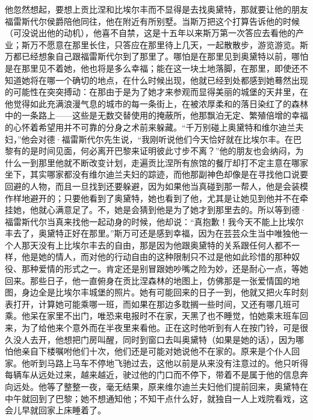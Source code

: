 \par 他忽然想起，要想上贡比涅和比埃尔丰而不显得是去找奥黛特，那就要让他的朋友福雷斯代尔侯爵陪他同往，他在附近有所别墅。当斯万把这个打算告诉他的时候（可没说出他的动机），他喜不自禁，这是十五年以来斯万第一次答应去看他的产业；斯万不愿意在那里长住，只答应在那里待上几天，一起散散步，游览游览。斯万都已经想象自己跟福雷斯代尔到了那里了。哪怕是在那里见到奥黛特以前，哪怕是在那里见不着她，他也将是多么幸福；能在这一块土地落脚，在那里，即使还不知道她将在哪一个确切的地点，在什么时候出现，他就已经到处都感到她蓦然出现的可能性在突突搏动：在那由于是为了她才来参观而显得美丽的城堡的天井里，在他觉得如此充满浪漫气息的城市的每一条街上，在被浓厚柔和的落日染红了的森林中的一条路上——这些是无数交替使用的掩蔽所，他那飘泊无定、繁殖倍增的幸福的心怀着希望用并不可靠的分身之术前来躲藏。“千万别碰上奥黛特和维尔迪兰夫妇，”他会对德·福雷斯代尔先生说，“我刚听说他们今天恰好就在比埃尔丰。在巴黎有的是时间见面，何必离开巴黎来证明彼此寸步不离？”他的朋友也会纳闷，为什么一到那里他就不断改变计划，走遍贡比涅所有旅馆的餐厅却打不定主意在哪家坐下，其实哪家都没有维尔迪兰夫妇的踪迹，而他那副神色却像是在寻找他口说要回避的人物，而且一旦找到还要躲避，因为如果他当真碰到那一帮人，他是会装模作样地避开的；只要他看到了奥黛特，她也看到了他，尤其是让她见到他并不在牵挂她，他就心满意足了。不，她是会猜到他是为了她才到那里去的。所以等到德·福雷斯代尔当真来找他一起动身的时候，他却说：“真抱歉！我今天不能上比埃尔丰去了，奥黛特正好在那里。”斯万可还是感到幸福，因为在芸芸众生当中唯独他一个人那天没有上比埃尔丰去的自由，那是因为他跟奥黛特的关系跟任何人都不一样，他是她的情人，而对他的行动自由的这种限制只不过是他如此珍惜的那种奴役、那种爱情的形式之一。肯定还是别冒跟她吵嘴之险为妙，还是耐心一点，等她回来。那些日子，他一直俯身在贡比涅森林的地图上，仿佛那是一张爱情国的地图，身边全是比埃尔丰城堡的照片。她有可能回来的日子一到，他就又把火车时刻表打开，计算她可能乘哪一班，而如果在那边多耽搁一些时间，又还有哪几班可乘。他呆在家里不出门，唯恐来电报时不在家，天黑了也不睡觉，怕她乘末班车回来，为了给他来个意外而在半夜里来看他。正在这时他听到有人在按门铃，可是很久没人去开，他想把门房叫醒，同时到窗口去叫奥黛特（如果是她的话），因为哪怕他亲自下楼嘱咐他们十次，他们还是可能对她说他不在家的。原来是个仆人回家。他听到马路上马车不停地飞驰过去，这他以前是从来没有注意过的。他只听得每辆车从远处过来，越来越近，驶过他的门口而不停下，带着不是属于他的信息奔向远处。他等了整整一夜，毫无结果，原来维尔迪兰夫妇他们提前回来，奥黛特在中午就回到了巴黎；她不想通知他；不知干点什么好，就独自一人上戏院看戏，这会儿早就回家上床睡着了。
